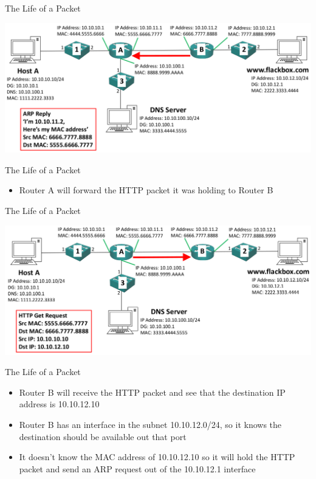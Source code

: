 \documentclass[pdflatex,compress,mathserif]{beamer}
\begin{document}
\begin{frame}{The Life of a Packet}
	\begin{center}
		\includegraphics[width=\linewidth]{img/img47}
	\end{center}
\end{frame}

\begin{frame}{The Life of a Packet}
	\begin{itemize}
		\item Router A will forward the HTTP packet it was holding to Router B
	\end{itemize}
\end{frame}

\begin{frame}{The Life of a Packet}
	\begin{center}
		\includegraphics[width=\linewidth]{img/img48}
	\end{center}
\end{frame}

\begin{frame}{The Life of a Packet}
	\begin{itemize}
		\item Router B will receive the HTTP packet and see that the destination IP address is 10.10.12.10
		\item Router B has an interface in the subnet 10.10.12.0/24, so it knows the destination should be available out that port
		\item It doesn’t know the MAC address of 10.10.12.10 so it will hold the HTTP packet and send an ARP request out of the 10.10.12.1 interface
	\end{itemize}
\end{frame}
\end{document}
